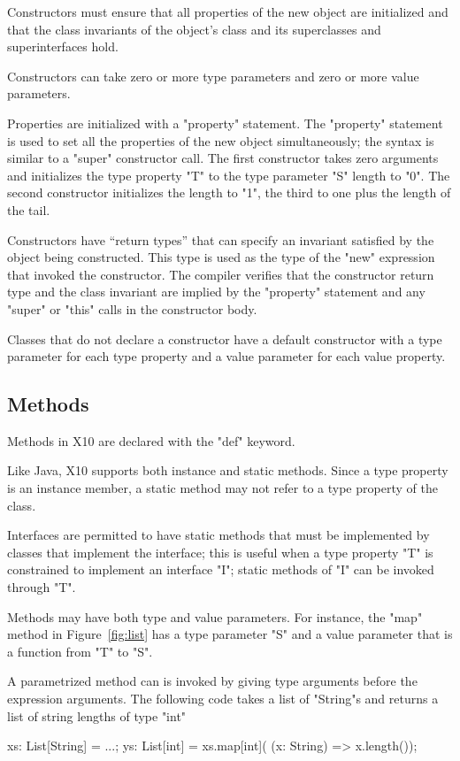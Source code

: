 \documentclass[preprint,nocopyrightspace,9pt]{sigplanconf}
\begin{document}
Constructors must ensure that all properties of the new object
are initialized and that the class invariants of the object's
class and its superclasses and superinterfaces hold.

Constructors can take zero or more type parameters and zero or
more value parameters.

Properties are initialized with a \xcd"property" statement.
The \xcd"property" statement is used to set all the properties
of the new object simultaneously; the syntax is similar to a \xcd"super"
constructor call.
The first constructor takes zero arguments and initializes the
type property \xcd"T" to the type parameter \xcd"S"
length to \xcd"0".  The second constructor initializes the
length to \xcd"1", the third to one plus the length of the tail.

Constructors have ``return
types'' that can specify an invariant satisfied by the object being
constructed.  This type 
is used as the type of the \xcd"new" expression that
invoked the constructor.
The compiler verifies that the
constructor return type and the class invariant are implied by the
\xcd"property" statement and any \xcd"super"
or \xcd"this" calls in the constructor body.

Classes that do not declare a constructor
have a default constructor with a type parameter for each
type property and a value parameter for each value property.

\subsection{Methods}

Methods in X10 are declared with the \xcd"def" keyword.

Like Java, X10 supports both instance and static methods.
Since a type property is an instance member, a static method may
not refer to a type property of the class.

Interfaces are permitted to have static methods that must be
implemented by classes that implement the interface; this is
useful when a type property \xcd"T" is constrained to implement
an interface \xcd"I"; static methods of \xcd"I" can be invoked
through \xcd"T".

Methods may have both type and value parameters.  
For instance, the \xcd"map" method in Figure~\ref{fig:list} 
has a type parameter \xcd"S" and a value parameter that is a
function from \xcd"T" to \xcd"S".

A parametrized method can is invoked by giving type arguments before the
expression arguments.  The following code takes a
list of \xcd"String"s and returns a list of string lengths of
type \xcd"int"
\begin{xten}
xs: List[String] = ...;
ys: List[int] = xs.map[int](
        (x: String) => x.length());
\end{xten}
\end{document}
